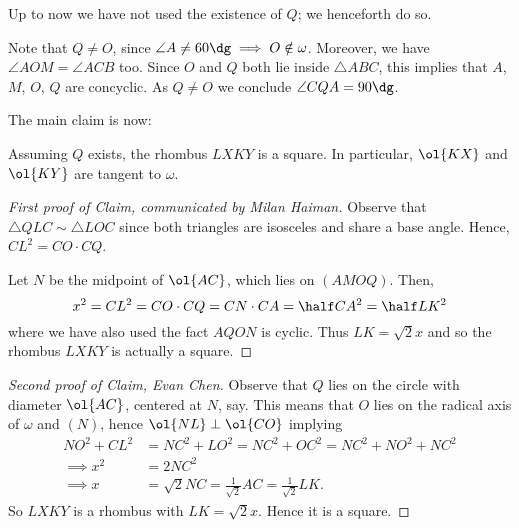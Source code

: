 Up to now we have not used the existence of $Q$; we henceforth do so.

Note that $Q \neq O$, since $\angle A \neq 60\dg \implies O \notin \omega$.
Moreover, we have $\angle AOM = \angle ACB$ too.
Since $O$ and $Q$ both lie inside $\triangle ABC$,
this implies that $A$, $M$, $O$, $Q$ are concyclic.
As $Q \neq O$ we conclude $\angle CQA = 90\dg$.

The main claim is now:
\begin{claim*}
  Assuming $Q$ exists, the rhombus $LXKY$ is a square.
  In particular, $\ol{KX}$ and $\ol{KY}$ are tangent to $\omega$.
\end{claim*}

\begin{proof}
  [First proof of Claim, communicated by Milan Haiman]
  Observe that $\triangle QLC \sim \triangle LOC$
  since both triangles are isosceles and share a base angle.
  Hence, $CL^2 = CO \cdot CQ$.

  Let $N$ be the midpoint of $\ol{AC}$, which lies on $(AMOQ)$.
  Then,
  \[ x^2 = CL^2 = CO \cdot CQ = CN \cdot CA = \half CA^2 = \half LK^2 \]
  where we have also used the fact $AQON$ is cyclic.
  Thus $LK = \sqrt2 x$ and so the rhombus $LXKY$ is actually a square.
\end{proof}

\begin{proof}
  [Second proof of Claim, Evan Chen]
  Observe that $Q$ lies on the circle with diameter $\ol{AC}$, centered at $N$, say.
  This means that $O$ lies on the radical axis of $\omega$ and $(N)$,
  hence $\ol{NL} \perp \ol{CO}$ implying
  \begin{align*}
    NO^2 + CL^2 &= NC^2 + LO^2
    = NC^2 + OC^2 = NC^2 + NO^2 + NC^2 \\
    \implies x^2 &= 2NC^2 \\
    \implies x &= \sqrt 2 NC = \frac{1}{\sqrt2} AC = \frac{1}{\sqrt2} LK.
  \end{align*}
  So $LXKY$ is a rhombus with $LK = \sqrt2 x$.
  Hence it is a square.
\end{proof}

